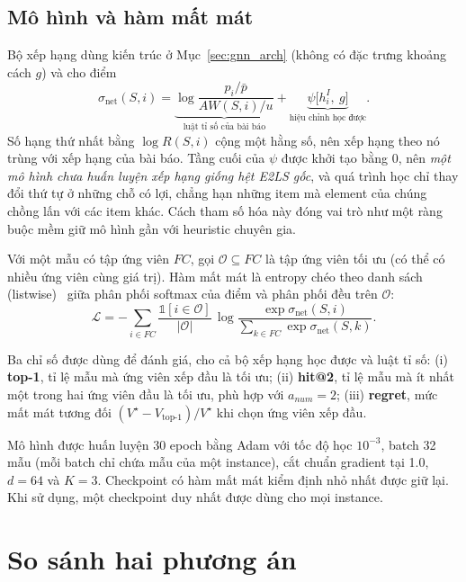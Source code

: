 \subsection{Mô hình và hàm mất mát}

Bộ xếp hạng dùng kiến trúc ở Mục~\ref{sec:gnn_arch} (không có đặc trưng khoảng cách $g$) và cho điểm
\begin{equation}
\sigma_{\text{net}}(S,i)=\underbrace{\log\frac{p_i/\bar p}{AW(S,i)/u}}_{\text{luật tỉ số của bài báo}}+\underbrace{\psi\big[h^I_i,\ g\big]}_{\text{hiệu chỉnh học được}} .
\label{eq:ranker}
\end{equation}
Số hạng thứ nhất bằng $\log R(S,i)$ cộng một hằng số, nên xếp hạng theo nó trùng với xếp hạng của bài báo. Tầng cuối của $\psi$ được khởi tạo bằng 0, nên \emph{một mô hình chưa huấn luyện xếp hạng giống hệt E2LS gốc}, và quá trình học chỉ thay đổi thứ tự ở những chỗ có lợi, chẳng hạn những item mà element của chúng chồng lấn với các item khác. Cách tham số hóa này đóng vai trò như một ràng buộc mềm giữ mô hình gần với heuristic chuyên gia.

Với một mẫu có tập ứng viên $FC$, gọi $\mathcal{O}\subseteq FC$ là tập ứng viên tối ưu (có thể có nhiều ứng viên cùng giá trị). Hàm mất mát là entropy chéo theo danh sách (listwise)~\cite{Cao2007} giữa phân phối softmax của điểm và phân phối đều trên $\mathcal{O}$:
\begin{equation}
\mathcal{L}=-\sum_{i\in FC}\frac{\mathbb{1}[i\in\mathcal{O}]}{|\mathcal{O}|}\,\log\frac{\exp\sigma_{\text{net}}(S,i)}{\sum_{k\in FC}\exp\sigma_{\text{net}}(S,k)} .
\label{eq:listwise}
\end{equation}

Ba chỉ số được dùng để đánh giá, cho cả bộ xếp hạng học được và luật tỉ số: (i) \textbf{top-1}, tỉ lệ mẫu mà ứng viên xếp đầu là tối ưu; (ii) \textbf{hit@2}, tỉ lệ mẫu mà ít nhất một trong hai ứng viên đầu là tối ưu, phù hợp với $a_{num}=2$; (iii) \textbf{regret}, mức mất mát tương đối $(V^\star-V_{\text{top-1}})/V^\star$ khi chọn ứng viên xếp đầu.

Mô hình được huấn luyện 30 epoch bằng Adam với tốc độ học $10^{-3}$, batch 32 mẫu (mỗi batch chỉ chứa mẫu của một instance), cắt chuẩn gradient tại 1.0, $d=64$ và $K=3$. Checkpoint có hàm mất mát kiểm định nhỏ nhất được giữ lại. Khi sử dụng, một checkpoint duy nhất được dùng cho mọi instance.

\section{So sánh hai phương án}\label{sec:compare_methods}

